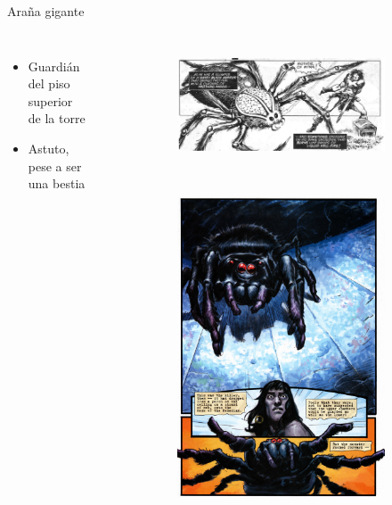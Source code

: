 \begin{frame}{Araña gigante}
\begin{columns}
\begin{itemize}
 \item Guardián del piso superior de la torre
 \item Astuto, pese a ser una bestia
\end{itemize}
\begin{figure}[htp]
 \centering
 \begin{subfigure}[b]{0.5\textwidth}
   \includegraphics[width=\textwidth]{img/arana/TSSC}
 \end{subfigure}
\\
 \begin{subfigure}[b]{0.3\textwidth}
   \includegraphics[width=\textwidth]{img/arana/DH}

\end{subfigure}
\end{figure}
\end{columns}
\end{frame}
